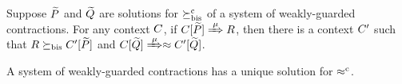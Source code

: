 \begin{lemma}
\label{l:ruptocon}
Suppose $\widetilde P$ and $\widetilde Q$ are solutions  for $\mathrel{\succeq^{\rm{c}}_{\rm{bis}}}$ 
 of a system of weakly-guarded
contractions.
For any context $C$, 
if  $\ct{\til P}\Arr{\mu}  R$,
 then 
there is a  context $C'$
such that $R \mathrel{\succeq_{\rm{bis}}} C' [\widetilde P]$ and  $\ct{\til Q} \Arr{\mu}
 \wb \ctp{\til Q}$.
\end{lemma}

\begin{theorem}
\label{t:rcontraBisimulationU}
A system of weakly-guarded contractions
    has 
a unique solution 
 for $\mathrel{\approx^{\rm{c}}}$.
\end{theorem} 

